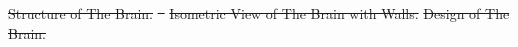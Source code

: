 \documentclass[a4paper,12pt,twoside]{article}
\providecommand{\DIFdeltex}[1]{{\protect\color{red}\sout{#1}}}                      %
\providecommand{\DIFdelbegin}{} %
\providecommand{\DIFdelend}{} %
\providecommand{\DIFdelFL}[1]{\DIFdel{#1}} %
\providecommand{\DIFdel}[1]{\texorpdfstring{\DIFdeltex{#1}}{}} %
\newcommand{\DIFscaledelfig}{0.5}
\newlength{\DIFdelgraphicswidth} %
\newlength{\DIFdelgraphicsheight} %
\newcommand{\DIFdelincludegraphics}[2][]{%
\sbox{\DIFdelgraphicsbox}{\DIFOincludegraphics[#1]{#2}}%
\settoboxwidth{\DIFdelgraphicswidth}{\DIFdelgraphicsbox} %
\settoboxtotalheight{\DIFdelgraphicsheight}{\DIFdelgraphicsbox} %
\scalebox{\DIFscaledelfig}{%
\parbox[b]{\DIFdelgraphicswidth}{\usebox{\DIFdelgraphicsbox}\\[-\baselineskip] \rule{\DIFdelgraphicswidth}{0em}}\llap{\resizebox{\DIFdelgraphicswidth}{\DIFdelgraphicsheight}{%
\setlength{\unitlength}{\DIFdelgraphicswidth}%
\begin{picture}(1,1)%
\thicklines\linethickness{2pt} %
{\color[rgb]{1,0,0}\put(0,0){\framebox(1,1){}}}%
{\color[rgb]{1,0,0}\put(0,0){\line( 1,1){1}}}%
{\color[rgb]{1,0,0}\put(0,1){\line(1,-1){1}}}%
\end{picture}%
}\hspace*{3pt}}} %
} %
\DeclareRobustCommand{\DIFdelbegin}{\DIFOdelbegin \let\includegraphics\DIFdelincludegraphics} %
\DeclareRobustCommand{\DIFdelend}{\DIFOaddend \let\includegraphics\DIFOincludegraphics} %
\begin{document}
\DIFdelbegin %
{%
\DIFdelFL{Structure of The Brain.}}
\DIFdelFL{~
    }%
{%
\DIFdelFL{Isometric View of The Brain with Walls.}}
{%
\DIFdelFL{Design of The Brain.}}
\DIFdelend %



\end{document}
